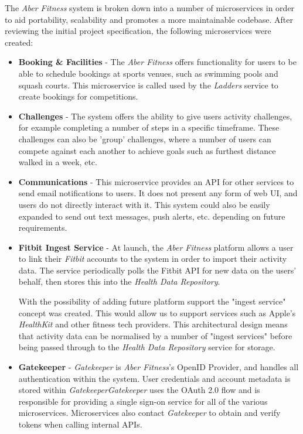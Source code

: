 The \textit{Aber Fitness} system is broken down into a number of microservices in order to aid portability, scalability and promotes a more maintainable codebase. After reviewing the initial project specification, the following microservices were created:

\begin{itemize}

	\item \textbf{Booking \& Facilities} - The \textit{Aber Fitness} offers functionality for users to be able to schedule bookings at sports venues, such as swimming pools and squash courts. This microservice is called used by the \textit{Ladders} service to create bookings for competitions.

	\item \textbf{Challenges} - The system offers the ability to give users activity challenges, for example completing a number of steps in a specific timeframe. These challenges can also be 'group' challenges, where a number of users can compete against each another to achieve goals such as furthest distance walked in a week, etc.

	\item \textbf{Communications} - This microservice provides an API for other services to send email notifications to users. It does not present any form of web UI, and users do not directly interact with it. This system could also be easily expanded to send out text messages, push alerts, etc. depending on future requirements.

	\item \textbf{Fitbit Ingest Service} - At launch, the \textit{Aber Fitness} platform allows a user to link their \textit{Fitbit} accounts to the system in order to import their activity data. The service periodically polls the Fitbit API for new data on the users' behalf, then stores this into the \textit{Health Data Repository}.
	
	\par With the possibility of adding future platform support the "ingest service" concept was created. This would allow us to support services such as Apple's \textit{HealthKit} and other fitness tech providers. 
	This architectural design means that activity data can be normalised by a number of "ingest services" before being passed through to the \textit{Health Data Repository} service for storage. 

	\item \textbf{Gatekeeper} - \textit{Gatekeeper} is \textit{Aber Fitness}'s OpenID Provider, and handles all authentication within the system. User credentials and account metadata is stored within \textit{Gatekeeper}\textit{Gatekeeper} uses the OAuth 2.0 flow and is responsible for providing a single sign-on service for all of the various microservices. Microservices also contact \textit{Gatekeeper} to obtain and verify tokens when calling internal APIs.


\end{itemize}
